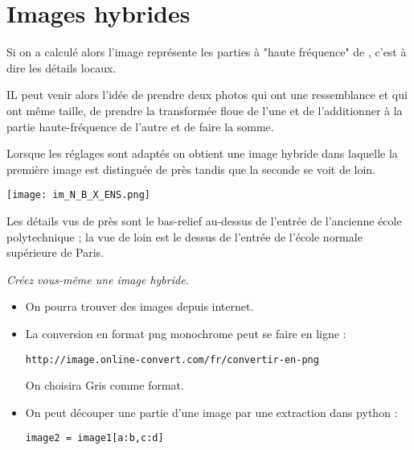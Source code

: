 \section{Images hybrides}
Si on a calculé  alors l'image  représente les parties à "haute fréquence" de , c'est à dire les détails locaux.

IL peut venir alors l'idée de prendre deux photos qui ont une ressemblance et qui ont même taille, de prendre la transformée floue de l'une et de l'additionner à la partie haute-fréquence de l'autre et de faire la somme.

Lorsque les réglages sont adaptés on obtient une image hybride dans laquelle la première image est distinguée de près tandis que la seconde se voit de loin.

\begin{center}
\texttt{[image: im\_N\_B\_X\_ENS.png]}
\end{center}

Les détails vus de près sont le bas-relief au-dessus de l'entrée de l'ancienne école polytechnique ; la vue de loin est le dessus de l'entrée de l'école normale supérieure de Paris.

\begin{Exercise}[title=Projet]\it Créez vous-même une image hybride.
\end{Exercise}


\begin{itemize}
\item On pourra trouver des images depuis internet.

\item La conversion en format png monochrome peut se faire en ligne :

\texttt{http://image.online-convert.com/fr/convertir-en-png}

On choisira Gris comme format.

\item On peut découper une partie d'une image par une extraction dans python : 

\texttt{image2 = image1[a:b,c:d]}

\end{itemize}
